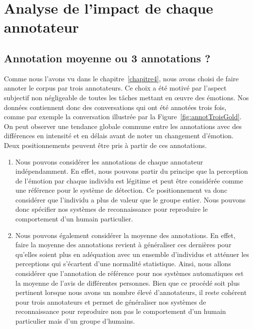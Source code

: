 \section{Analyse de l'impact de chaque annotateur}

\subsection{Annotation moyenne ou 3 annotations ?}
Comme nous l'avons vu dans le chapitre~\ref{chapitre4}, nous avons choisi de faire annoter le corpus par trois annotateurs. Ce choix a été motivé par l'aspect subjectif non négligeable de toutes les tâches mettant en œuvre des émotions. Nos données contiennent donc des conversations qui ont été annotées trois fois, comme par exemple la conversation illustrée par la Figure~\ref{fig:annotTroisGold}. On peut observer une tendance globale commune entre les annotations avec des différences en intensité et en délais avant de noter un changement d'émotion. Deux positionnements peuvent être pris à partir de ces annotations.



\begin{enumerate}
  \item Nous pouvons considérer les annotations de chaque annotateur indépendamment. En effet, nous pouvons partir du principe que la perception de l'émotion par chaque individu est légitime et peut être considérée comme une référence pour le système de détection.
  Ce positionnement va donc considérer que l'individu a plus de valeur que le groupe entier. Nous pouvons donc spécifier nos systèmes de reconnaissance pour reproduire le comportement d'un humain particulier.
  \item Nous pouvons également considérer la moyenne des annotations. En effet, faire la moyenne des annotations revient à généraliser ces dernières pour qu'elles soient plus en adéquation avec un ensemble d'individus et atténuer les perceptions qui s'écartent d'une normalité statistique. Ainsi, nous allons considérer que l'annotation de référence pour nos systèmes automatiques est la moyenne de l'avis de différentes personnes. Bien que ce procédé soit plus pertinent lorsque nous avons un nombre élevé d'annotateurs, il reste cohérent pour trois annotateurs et permet de généraliser nos systèmes de reconnaissance pour reproduire non pas le comportement d'un humain particulier mais d'un groupe d'humains.
\end{enumerate}

